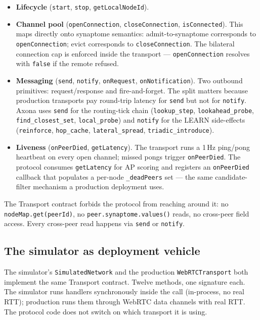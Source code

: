 \documentclass[conference]{IEEEtran}
\newcommand{\axona}{Axona\xspace}
\begin{document}
\begin{itemize}\itemsep2pt
\item \textbf{Lifecycle} (\texttt{start}, \texttt{stop},
  \texttt{getLocalNodeId}).
\item \textbf{Channel pool} (\texttt{openConnection},
  \texttt{closeConnection}, \texttt{isConnected}). This maps
  directly onto synaptome semantics: admit-to-synaptome corresponds
  to \texttt{openConnection}; evict corresponds to
  \texttt{closeConnection}. The bilateral connection cap is enforced
  inside the transport --- \texttt{openConnection} resolves with
  \texttt{false} if the remote refused.
\item \textbf{Messaging} (\texttt{send},
  \texttt{notify}, \texttt{onRequest}, \texttt{onNotification}).
  Two outbound primitives: request/response and fire-and-forget.
  The split matters because production transports pay round-trip
  latency for \texttt{send} but not for \texttt{notify}. \axona
  uses \texttt{send} for the routing-tick chain
  (\texttt{lookup\_step}, \texttt{lookahead\_probe},
  \texttt{find\_closest\_set}, \texttt{local\_probe}) and
  \texttt{notify} for the LEARN side-effects (\texttt{reinforce},
  \texttt{hop\_cache}, \texttt{lateral\_spread},
  \texttt{triadic\_introduce}).
\item \textbf{Liveness} (\texttt{onPeerDied},
  \texttt{getLatency}). The transport runs a 1\,Hz ping/pong
  heartbeat on every open channel; missed pongs trigger
  \texttt{onPeerDied}. The protocol consumes \texttt{getLatency}
  for AP scoring and registers an \texttt{onPeerDied} callback
  that populates a per-node \texttt{\_deadPeers} set --- the same
  candidate-filter mechanism a production deployment uses.
\end{itemize}

The Transport contract forbids the protocol from reaching around
it: no \texttt{nodeMap.get(peerId)}, no
\texttt{peer.synaptome.values()} reads, no cross-peer field
access. Every cross-peer read happens via \texttt{send} or
\texttt{notify}.

\subsection{The simulator as deployment vehicle}

The simulator's \texttt{SimulatedNetwork} and the production
\texttt{WebRTCTransport} both implement the same Transport
contract. Twelve methods, one signature each. The simulator runs
handlers synchronously inside the call (in-process, no real RTT);
production runs them through WebRTC data channels with real RTT.
The protocol code does not switch on which transport it is using.
\end{document}
